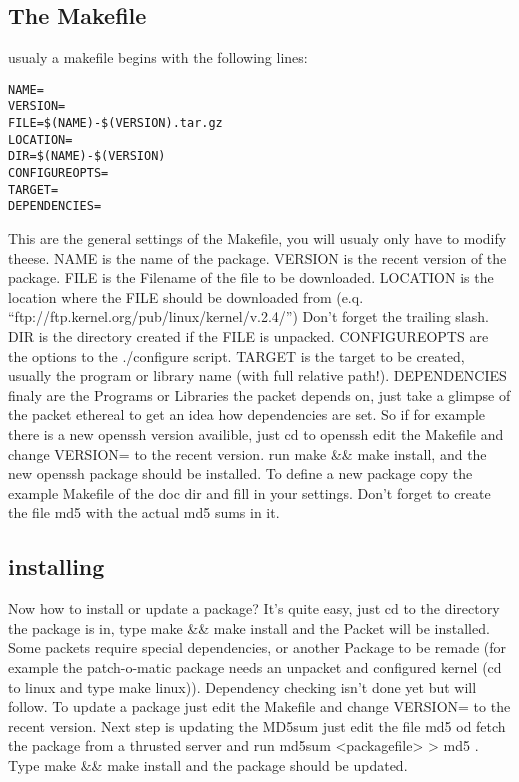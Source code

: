 \documentclass[11pt,a4paper]{article}
\begin{document}
\subsection{The Makefile}
usualy a makefile begins with the following lines:
\begin{verbatim}
NAME=
VERSION=
FILE=$(NAME)-$(VERSION).tar.gz
LOCATION=
DIR=$(NAME)-$(VERSION)
CONFIGUREOPTS=
TARGET=
DEPENDENCIES=
\end{verbatim}
This are the general settings of the Makefile, you will usualy only have to modify theese. NAME is the name of the package. VERSION is the recent version of the package. FILE is the Filename of the file to be downloaded. LOCATION is the location where the FILE should be downloaded from (e.q. ``ftp://ftp.kernel.org/pub/linux/kernel/v.2.4/'') Don't forget the trailing slash. DIR is the directory created if the FILE is unpacked. CONFIGUREOPTS are the options to the ./configure script. TARGET is the target to be created, usually the program or library name (with full relative path!). DEPENDENCIES finaly are the Programs or Libraries the packet depends on, just take a glimpse of the packet ethereal to get an idea how dependencies are set. So if for example there is a new openssh version availible, just cd to openssh edit the Makefile and change VERSION= to the recent version. run make \&{}\&{} make install, and the new openssh package should be installed. To define a new package copy the example Makefile of the doc dir and fill in your settings. Don't forget to create the file md5 with the actual md5 sums in it.

\subsection{installing}
Now how to install or update a package? It's quite easy, just cd to the directory the package is in, type make \&\& make install and the Packet will be installed. Some packets require special dependencies, or another Package to be remade (for example the patch-o-matic package needs an unpacket and configured kernel (cd to linux and type make linux)). Dependency checking isn't done yet but will follow. To update a package just edit the Makefile and change VERSION= to the recent version. Next step is updating the MD5sum just edit the file md5 od fetch the package from a thrusted server and run md5sum <packagefile> > md5 . Type make \&\& make install and the package should be updated.
\end{document}
